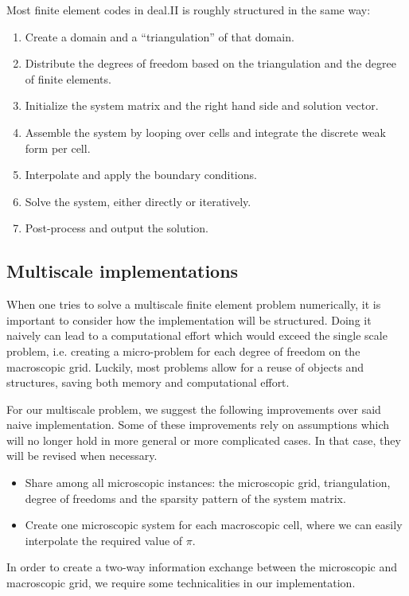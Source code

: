 \documentclass{article}
\begin{document}
Most finite element codes in deal.II is roughly structured in the same way:

\begin{enumerate}
    \item Create a domain and a ``triangulation'' of that domain.
    \item Distribute the degrees of freedom based on the triangulation and the degree of finite elements.
    \item Initialize the system matrix and the right hand side and solution vector.
    \item Assemble the system by looping over cells and integrate the discrete weak form per cell.
    \item Interpolate and apply the boundary conditions.
    \item Solve the system, either directly or iteratively.
    \item Post-process and output the solution.
\end{enumerate}



\subsection{Multiscale implementations}
When one tries to solve a multiscale finite element problem numerically, it is important to consider how the implementation will be structured.
Doing it naively can lead to a computational effort which would exceed the single scale problem, i.e. creating a micro-problem for each degree of freedom on the macroscopic grid.
Luckily, most problems allow for a reuse of objects and structures, saving both memory and computational effort.

For our multiscale problem, we suggest the following improvements over said naive implementation. Some of these improvements rely on assumptions which will no longer hold in more general or more complicated cases. In that case, they will be revised when necessary.
\begin{itemize}
    \item Share among all microscopic instances: the microscopic grid, triangulation, degree of freedoms and the sparsity pattern of the system matrix.
    \item Create one microscopic system for each macroscopic cell, where we can easily interpolate the required value of $\pi$.
\end{itemize}

In order to create a two-way information exchange between the microscopic and macroscopic grid, we require some technicalities in our implementation.
\end{document}
